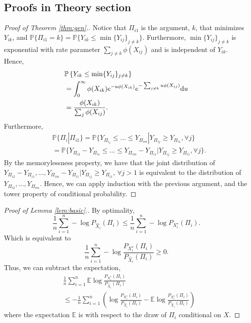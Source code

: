 \documentclass{article}
\begin{document}
\subsection{Proofs in Theory section}

\begin{proof}[Proof of Theorem \ref{thm:gen}.]
Notice that $\Pi_{i1}$ is the argument, $k$, that minimizes $Y_{ik}$, and 
$\mathbb P \{ \Pi_{i1} = k \} = \mathbb P\{ Y_{ik} \le \min \{ Y_{ij}\}_{j \ne k} \}$.
Furthermore, $\min \{ Y_{ij}\}_{j \ne k}$ is exponential with rate parameter $\sum_{j\ne k} \phi(X_{ij})$ and is independent of $Y_{ik}$.  Hence,
\begin{align*}
&\mathbb P\left\{ Y_{ik} \le \min \{ Y_{ij}\}_{j \ne k} \right\} \\
&= \int_0^\infty \phi(X_{ik}) e^{-u \phi(X_{ik})} e^{- \sum_{j \ne k} u \phi(X_{ij})} {\rm d}u \\
&= \frac{\phi(X_{ik})}{\sum_j \phi(X_{ij})}.
\end{align*}
Furthermore,
\begin{align*}
&\mathbb P \{ \Pi_i | \Pi_{i1} \} = \mathbb P \{ Y_{\Pi_{i_2}} \le \ldots \le Y_{\Pi_{im}} | Y_{\Pi_{ij}} \ge Y_{\Pi_{i1}}, \forall j\} \\
&= \mathbb P \{ Y_{\Pi_{i2}} - Y_{\Pi_{i1}} \le \ldots \le Y_{\Pi_{im}} - Y_{\Pi_{i1}} | Y_{\Pi_{ij}} \ge Y_{\Pi_{i1}}, \forall j\}.
\end{align*}
By the memorylessness property, we have that the joint distribution of $Y_{\Pi_{i2}} - Y_{\Pi_{i1}}, \ldots, Y_{\Pi_{im}} - Y_{\Pi_{i1}} | Y_{\Pi_{ij}} \ge Y_{\Pi_{i1}}$, $\forall j>1$ is equivalent to the distribution of $Y_{\Pi_{i2}}, \ldots, Y_{\Pi_{im}}$.
Hence, we can apply induction with the previous argument, and the tower property of conditional probability.
\end{proof}


\begin{proof}[Proof of Lemma \ref{lem:basic}.]
By optimality, 
\begin{equation*}
\frac 1n \sum_{i=1}^n - \log P_{\hat X_i}(\Pi_i) \le \frac 1n \sum_{i=1}^n - \log P_{X_i^\star}(\Pi_i).
\end{equation*}
Which is equivalent to 
\begin{equation*}
\frac 1n \sum_{i=1}^n - \log \frac{P_{X_i^\star}(\Pi_i)}{P_{\hat X_i}(\Pi_i)} \ge 0.
\end{equation*}
Thus, we can subtract the expectation,
\begin{align*}
&\frac 1n \sum_{i=1}^n \mathbb E \log \frac{P_{X_i^\star}(\Pi_i)}{P_{\hat X_i}(\Pi_i)} \\
&\le - \frac 1n \sum_{i=1}^n \left( \log \frac{P_{X_i^\star}(\Pi_i)}{P_{\hat X_i}(\Pi_i)} - \mathbb E \log \frac{P_{X_i^\star}(\Pi_i)}{P_{\hat X_i}(\Pi_i)} \right)
\end{align*}
where the expectation $\mathbb E$ is with respect to the draw of $\Pi_i$ conditional on $X$.
\end{proof}
\end{document}
